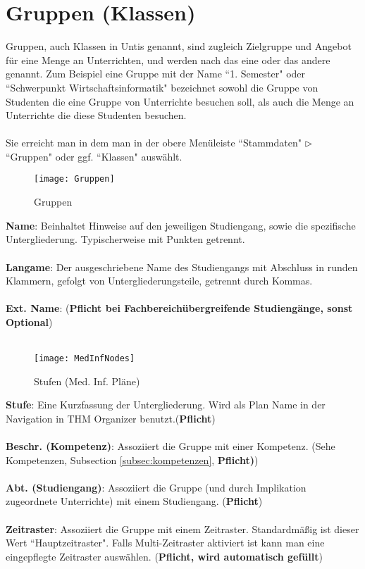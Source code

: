 \documentclass[]{report}
\begin{document}
\newpage
\section{Gruppen (Klassen)}

Gruppen, auch Klassen in Untis genannt, sind zugleich Zielgruppe und Angebot für eine Menge an Unterrichten, und werden nach das eine oder das andere genannt. Zum Beispiel eine Gruppe mit der Name ``1. Semester" oder ``Schwerpunkt Wirtschaftsinformatik" bezeichnet sowohl die Gruppe von Studenten die eine Gruppe von Unterrichte besuchen soll, als auch die Menge an Unterrichte die diese Studenten besuchen.\\
\\
Sie erreicht man in dem man in der obere Menüleiste ``Stammdaten" $\triangleright$ ``Gruppen" oder ggf. ``Klassen" auswählt.

\begin{figure}[h]
	\texttt{[image: Gruppen]}
	\vspace{-15pt}
	\caption{Gruppen}
	\label{fig:groups}
\end{figure}

\noindent
\textbf{Name}: Beinhaltet Hinweise auf den jeweiligen Studiengang, sowie die spezifische Untergliederung. Typischerweise mit Punkten getrennt.\\
\\
\textbf{Langame}: Der ausgeschriebene Name des Studiengangs mit Abschluss in runden Klammern, gefolgt von Untergliederungsteile, getrennt durch Kommas.\\
\\
\textbf{Ext. Name}: (\textbf{Pflicht bei Fachbereichübergreifende Studiengänge, sonst Optional})\\
\\
\begin{wrapfigure}{r}{0.4\textwidth}
	\vspace{-10pt}
	\texttt{[image: MedInfNodes]}
	\vspace{-5pt}
	\caption{Stufen (Med. Inf. Pläne)}
	\label{fig:steps}
\end{wrapfigure}
\textbf{Stufe}: Eine Kurzfassung der Untergliederung. Wird als Plan Name in der Navigation in THM Organizer benutzt.(\textbf{Pflicht})\\
\\
\textbf{Beschr. (Kompetenz)}: Assoziiert die Gruppe mit einer Kompetenz. (Sehe Kompetenzen, Subsection  \ref{subsec:kompetenzen}, \textbf{Pflicht)})\\
\\
\textbf{Abt. (Studiengang)}: Assoziiert die Gruppe (und durch Implikation zugeordnete Unterrichte) mit einem Studiengang. (\textbf{Pflicht})\\
\\
\textbf{Zeitraster}: Assoziiert die Gruppe mit einem Zeitraster. Standardmäßig ist dieser Wert ``Hauptzeitraster". Falls Multi-Zeitraster aktiviert ist kann man eine eingepflegte Zeitraster auswählen. (\textbf{Pflicht, wird automatisch gefüllt})
\end{document}
